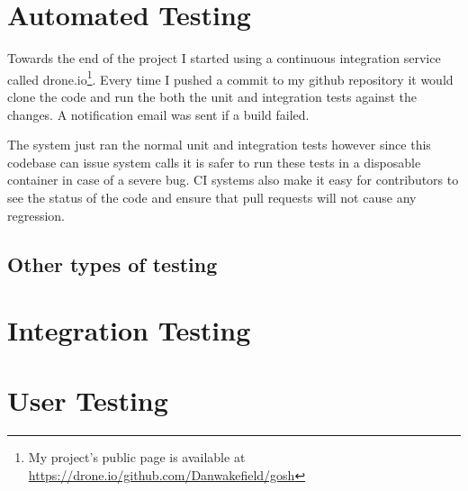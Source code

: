 \section{Automated Testing}
Towards the end of the project I started using a continuous integration service called drone.io\footnote{My project's public page is available at \url{https://drone.io/github.com/Danwakefield/gosh}}.
Every time I pushed a commit to my github repository it would clone the code and run the both the unit and integration tests against the changes.
A notification email was sent if a build failed.

The system just ran the normal unit and integration tests however since this codebase can issue system calls it is safer to run these tests in a disposable container in case of a severe bug.  
CI systems also make it easy for contributors to see the status of the code and ensure that pull requests will not cause any regression.

\subsection{Other types of testing}

\section{Integration Testing}

\section{User Testing}